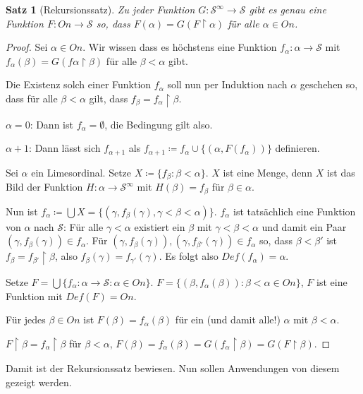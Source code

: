 \documentclass[german]{article}
\theoremstyle{break}
\theoremstyle{def_style}
\theoremstyle{def_style}
\newtheorem{satz}{Satz}[section]
\theoremstyle{lemma_style}
\begin{document}
\begin{satz}[Rekursionssatz]
	Zu jeder Funktion $G:\mathcal{S}^\infty\to\mathcal{S}$ gibt es genau eine Funktion $F:On\to\mathcal{S}$ so, dass $F(\alpha)=G(F\upharpoonright\alpha)$ für alle $\alpha\in On$.
\end{satz}
\begin{proof}
	Sei $\alpha\in On$. Wir wissen dass es höchstens eine Funktion $f_\alpha:\alpha\to\mathcal{S}$ mit $f_\alpha(\beta)=G(f\alpha\upharpoonright\beta)$ für alle $\beta<\alpha$ gibt.
	
	Die Existenz solch einer Funktion $f_\alpha$ soll nun per Induktion nach $\alpha$ geschehen so, dass für alle $\beta<\alpha$ gilt, dass $f_\beta=f_\alpha\upharpoonright\beta$.
	
	$\alpha=0$: Dann ist $f_\alpha=\emptyset$, die Bedingung gilt also.
	
	$\alpha+1$: Dann lässt sich $f_{\alpha+1}$ als $f_{\alpha+1}\coloneqq f_\alpha\cup\{(\alpha, F(f_\alpha))\}$ definieren.
	
	Sei $\alpha$ ein Limesordinal. Setze $X\coloneqq\{f_\beta : \beta < \alpha\}$. $X$ ist eine Menge, denn $X$ ist das Bild der Funktion $H:\alpha\to\mathcal{S}^\infty$ mit $H(\beta)=f_\beta$ für $\beta\in\alpha$.
	
	Nun ist $f_\alpha\coloneqq\bigcup X=\{(\gamma,f_\beta(\gamma), \gamma<\beta<\alpha)\}$. $f_\alpha$ ist tatsächlich eine Funktion von $\alpha$ nach $\mathcal{S}$: Für alle $\gamma<\alpha$ existiert ein $\beta$ mit $\gamma<\beta<\alpha$ und damit ein Paar $(\gamma,f_\beta(\gamma))\in f_\alpha$. Für $(\gamma,f_\beta(\gamma)),(\gamma,f_{\beta'}(\gamma))\in f_\alpha$ so, dass $\beta<\beta'$ ist $f_\beta=f_{\beta'}\upharpoonright \beta$, also $f_\beta(\gamma)=f_{\gamma'}(\gamma)$. Es folgt also $Def(f_\alpha)=\alpha$.
	
	Setze $F=\bigcup\{f_\alpha:\alpha\to\mathcal{S} : \alpha\in On\}$. $F=\{(\beta, f_\alpha(\beta)):\beta<\alpha\in On\}$, $F$ ist eine Funktion mit $Def(F)=On$.
	
	Für jedes $\beta\in On$ ist $F(\beta)=f_\alpha(\beta)$ für ein (und damit alle!) $\alpha$ mit $\beta<\alpha$.
	
	$F\upharpoonright\beta=f_\alpha\upharpoonright\beta$ für $\beta<\alpha$, $F(\beta)=f_\alpha(\beta)=G(f_\alpha\upharpoonright\beta)=G(F\upharpoonright\beta)$.
\end{proof}

Damit ist der Rekursionssatz bewiesen. Nun sollen Anwendungen von diesem gezeigt werden.\\
\end{document}
